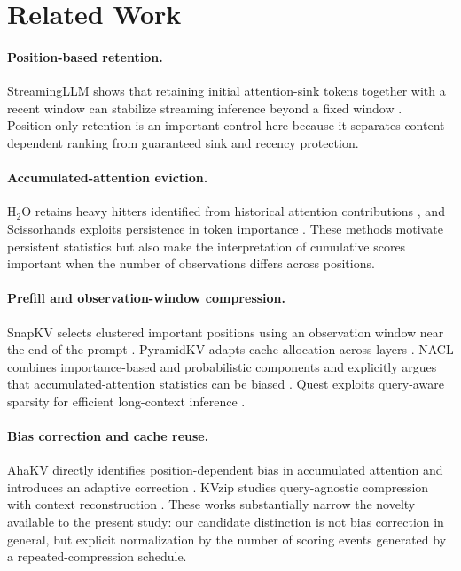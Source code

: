 \documentclass[10pt,twocolumn]{article}
\begin{document}
\section{Related Work}
\paragraph{Position-based retention.}
StreamingLLM shows that retaining initial attention-sink tokens together with a recent window can stabilize streaming inference beyond a fixed window \citep{xiao2023streamingllm}. Position-only retention is an important control here because it separates content-dependent ranking from guaranteed sink and recency protection.

\paragraph{Accumulated-attention eviction.}
H$_2$O retains heavy hitters identified from historical attention contributions \citep{zhang2023h2o}, and Scissorhands exploits persistence in token importance \citep{liu2023scissorhands}. These methods motivate persistent statistics but also make the interpretation of cumulative scores important when the number of observations differs across positions.

\paragraph{Prefill and observation-window compression.}
SnapKV selects clustered important positions using an observation window near the end of the prompt \citep{li2024snapkv}. PyramidKV adapts cache allocation across layers \citep{cai2024pyramidkv}. NACL combines importance-based and probabilistic components and explicitly argues that accumulated-attention statistics can be biased \citep{chen2024nacl}. Quest exploits query-aware sparsity for efficient long-context inference \citep{tang2024quest}.

\paragraph{Bias correction and cache reuse.}
AhaKV directly identifies position-dependent bias in accumulated attention and introduces an adaptive correction \citep{gu2025ahakv}. KVzip studies query-agnostic compression with context reconstruction \citep{kim2025kvzip}. These works substantially narrow the novelty available to the present study: our candidate distinction is not bias correction in general, but explicit normalization by the number of scoring events generated by a repeated-compression schedule.
\end{document}
